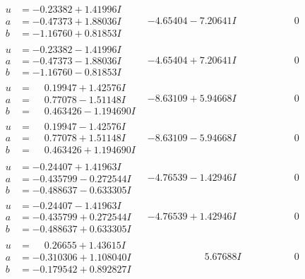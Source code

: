 \documentclass[1p]{elsarticle_modified}
\theoremstyle{definition}
\begin{document}
$$\begin{array}{c|c|c}
\begin{aligned}
u &= -0.23382 + 1.41996 I \\
a &= -0.47373 + 1.88036 I \\
b &= -1.16760 + 0.81853 I\end{aligned}
 & -4.65404 - 7.20641 I & \phantom{-0.000000 } 0 \\ \hline\begin{aligned}
u &= -0.23382 - 1.41996 I \\
a &= -0.47373 - 1.88036 I \\
b &= -1.16760 - 0.81853 I\end{aligned}
 & -4.65404 + 7.20641 I & \phantom{-0.000000 } 0 \\ \hline\begin{aligned}
u &= \phantom{-}0.19947 + 1.42576 I \\
a &= \phantom{-}0.77078 - 1.51148 I \\
b &= \phantom{-}0.463426 - 1.194690 I\end{aligned}
 & -8.63109 + 5.94668 I & \phantom{-0.000000 } 0 \\ \hline\begin{aligned}
u &= \phantom{-}0.19947 - 1.42576 I \\
a &= \phantom{-}0.77078 + 1.51148 I \\
b &= \phantom{-}0.463426 + 1.194690 I\end{aligned}
 & -8.63109 - 5.94668 I & \phantom{-0.000000 } 0 \\ \hline\begin{aligned}
u &= -0.24407 + 1.41963 I \\
a &= -0.435799 - 0.272544 I \\
b &= -0.488637 - 0.633305 I\end{aligned}
 & -4.76539 - 1.42946 I & \phantom{-0.000000 } 0 \\ \hline\begin{aligned}
u &= -0.24407 - 1.41963 I \\
a &= -0.435799 + 0.272544 I \\
b &= -0.488637 + 0.633305 I\end{aligned}
 & -4.76539 + 1.42946 I & \phantom{-0.000000 } 0 \\ \hline\begin{aligned}
u &= \phantom{-}0.26655 + 1.43615 I \\
a &= -0.310306 + 1.108040 I \\
b &= -0.179542 + 0.892827 I\end{aligned}
 & \phantom{-0.000000 -}5.67688 I & \phantom{-0.000000 } 0 \\ \hline\begin{aligned}

\end{aligned}
\end{array}$$
\end{document}

